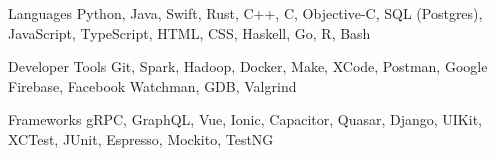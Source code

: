 

\begin{cvskills}


  \cvskill
    {Languages} %
    {Python, Java, Swift, Rust, C++, C, Objective-C, SQL (Postgres), JavaScript, TypeScript, HTML, CSS, Haskell, Go, R, Bash} %

  \cvskill
    {Developer Tools} %
    {Git, Spark, Hadoop, Docker, Make, XCode, Postman, Google Firebase, Facebook Watchman, GDB, Valgrind} %

  \cvskill
  {Frameworks} %
  {gRPC, GraphQL, Vue, Ionic, Capacitor, Quasar, Django, UIKit, XCTest, JUnit, Espresso, Mockito, TestNG} %

\end{cvskills}
